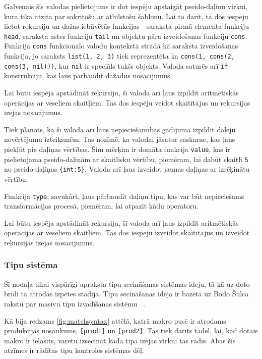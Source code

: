Galvenais šīs valodas pielietojums ir dot iespēju apstaigāt pseido-daļiņu virkni, kura tika atzīta par sakrītošu ar atbilstošu šablonu. Lai to darīt, tā dos iespēju lietot rekursiju un dažas iebūvētās funkcijas - saraksta pirmā elementa funkciju \verb|head|, saraksta astes funkciju \verb|tail| un objektu pāra izveidošanas funkciju \verb|cons|. Funkcija \verb|cons| funkcionālo valodu kontekstā strādā kā saraksta izveidošanas funkcija, jo saraksts \verb|list(1, 2, 3)| tiek reprezentēta ka \verb|cons(1, cons(2, cons(3, nil)))|, kur \verb|nil| ir speciāls tukšs objekts. Valoda saturēs arī \verb|if| konstrukciju, kas ļaus pārbaudīt dažādus nosacījumus.

Lai būtu iespēja apstādināt rekursiju, šī valoda arī ļaus izpildīt aritmētiskās operācijas ar veseliem skaitļiem. Tas dos iespēju veidot skaitītājus un rekursijas izejas nosacījumus.

Tiek plānots, ka šī valoda arī ļaus nepieciešamības gadījumā izpildīt daļēju novērtējumu izteiksmēm. Tas nozīmē, ka valodai jāsatur saskarne, kas ļaus piekļūt pie daļiņas vērtības. Šim mērķim ir domāta funkcija \verb|value|, kas ir pielietojama pseido-daļiņām ar skaitlisku vērtību, piemēram, lai dabūt skaitli \verb|5| no pseido-daļiņas \verb|{int:5}|. Valoda arī ļaus izveidot jaunas daļiņas ar izrēķinātu vērtību.

Funkcija \verb|type|, savukārt, ļaus pārbaudīt daļiņu tipu, kas var būt nepieciešams transformācijas procesā, piemēram, lai atpazīt kādu operatoru.

Lai būtu iespēja apstādināt rekursiju, šī valoda arī ļaus izpildīt aritmētiskās operācijas ar veseliem skaitļiem. Tas dos iespēju izveidot skaitītājus un izveidot rekursijas izejas nosacījumus.

\subsubsection{\label{sbsbs:sys_typesystem}Tipu sistēma}

Šī nodaļa tikai vispārīgi apraksta tipu secināšanas sistēmas ideju, tā kā uz doto brīdi tā atrodas izpētes stadijā. Tipu secināšanas ideja ir bāzēta uz Bodo Šulca rakstu par masīvu tipu izvadīšanas sistēmu ~\cite{Scholz:SACTypeSystem}.

Kā bija redzams \ref{fig:matchsyntax} attēlā, katrā makro pusē ir atrodams produkcijas nosaukums, \verb|[prod1]| un \verb|[prod2]|. Tas tiek darīts tādēļ, lai, kad dotais makro ir ielasīts, varētu izsecināt kāda tipa izejas virkni tas radīs. Abas šīs atzīmes ir rādītas tipu kontroles sistēmas dēļ.

